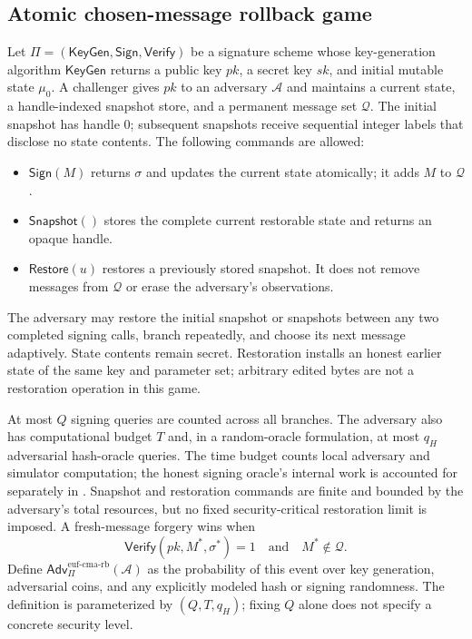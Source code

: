 \documentclass[a4paper,envcountsame,runningheads]{llncs}
\newcommand{\KG}{\mathsf{KeyGen}}
\newcommand{\Sign}{\mathsf{Sign}}
\newcommand{\Vf}{\mathsf{Verify}}
\newcommand{\Adv}{\mathsf{Adv}}
\begin{document}
\subsection{Atomic chosen-message rollback game}
Let $\Pi=(\KG,\Sign,\Vf)$ be a signature scheme whose key-generation algorithm $\KG$ returns a public key $pk$, a secret key $sk$, and initial mutable state $\mu_0$. A challenger gives $pk$ to an adversary $\mathcal A$ and maintains a current state, a handle-indexed snapshot store, and a permanent message set $\mathcal Q$. The initial snapshot has handle 0; subsequent snapshots receive sequential integer labels that disclose no state contents. The following commands are allowed:
\begin{itemize}
\item $\mathsf{Sign}(M)$ returns $\sigma$ and updates the current state atomically; it adds $M$ to $\mathcal Q$.
\item $\mathsf{Snapshot}()$ stores the complete current restorable state and returns an opaque handle.
\item $\mathsf{Restore}(u)$ restores a previously stored snapshot. It does not remove messages from $\mathcal Q$ or erase the adversary's observations.
\end{itemize}
The adversary may restore the initial snapshot or snapshots between any two completed signing calls, branch repeatedly, and choose its next message adaptively. State contents remain secret. Restoration installs an honest earlier state of the same key and parameter set; arbitrary edited bytes are not a restoration operation in this game.

At most $Q$ signing queries are counted across all branches. The adversary also has computational budget $T$ and, in a random-oracle formulation, at most $q_H$ adversarial hash-oracle queries. The time budget counts local adversary and simulator computation; the honest signing oracle's internal work is accounted for separately in . Snapshot and restoration commands are finite and bounded by the adversary's total resources, but no fixed security-critical restoration limit is imposed. A fresh-message forgery wins when
\begin{equation}\label{eq:win}
 \Vf(pk,M^*,\sigma^*)=1\quad\text{and}\quad M^*\notin\mathcal Q.
\end{equation}
Define $\Adv^{\mathrm{euf\text{-}cma\text{-}rb}}_{\Pi}(\mathcal A)$ as the probability of this event over key generation, adversarial coins, and any explicitly modeled hash or signing randomness. The definition is parameterized by $(Q,T,q_H)$; fixing $Q$ alone does not specify a concrete security level.
\end{document}
